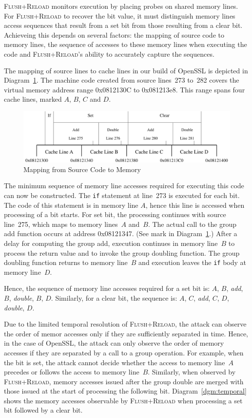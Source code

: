 \documentclass{llncs}
\begin{document}
\textsc{Flush+Reload} monitors execution by placing probes on shared memory lines.
For \textsc{Flush+Reload} to recover the bit value, it must distinguish memory lines access sequences
that result from a set bit from those resulting from a clear bit.
Achieveing this depends on several factors: the mapping of source code to memory lines, 
the sequence of accesses to these memory lines when executing the code and 
\textsc{Flush+Reload}'s ability to accurately capture the sequences.


The mapping of source lines to cache lines in our build of OpenSSL is depicted in Diagram~\ref{dgm:memory}.
The machine code created from source lines~273 to~282 covers the virtual memory address range 0x0812130C
to 0x081213e8.
This range spans four cache lines, marked $A$, $B$, $C$ and $D$.


\begin{figure}[htb]
\centering\includegraphics[width=\columnwidth]{images/memory}
\caption{Mapping from Source Code to Memory\label{dgm:memory}}
\end{figure}


The minimum sequence of memory line accesses required for executing this code can now be constructed.
The \texttt{if} statement at line~273 is executed for each bit.  
The code of this statement is in memory line $A$, hence this line is accessed when processing of a bit starts.
For set bit, the processing continues with source line~275, which maps to memory lines~$A$ and~$B$.
The actual call to the group add function occurs at address 0x08121347.
(See mark in Diagram~\ref{dgm:memory}.)
After a delay for computing the group add, execution continues in memory line~$B$ to process the return value and 
to invoke the group doubling function.
The group doubling function returns to memory line~$B$ and execution leaves the \texttt{if} body at memory line~$D$.

Hence, the sequence of memory line accesses required for a set bit is: $A$, $B$, \textit{add}, $B$, \textit{double}, $B$, $D$.
Similarly, for a clear bit, the sequence is: $A$, $C$, \textit{add}, $C$, $D$, \textit{double}, $D$.

Due to the limited temporal resolution of \textsc{Flush+Reload}, the attack can observe the order of memor accesses only
if they are sufficiently separated in time.
Hence, in the case of OpenSSL, the attack can only observe the order of memory accesses if they are separated by a call
to a group operation.
For example, when the bit is set, the attack cannot decide whether the access to memory line~$A$ precedes or follows the access
to memory line~$B$.
Similarly, when observed by \textsc{Flush+Reload}, memory accesses issued after the group double are merged with those 
issued at the start of processing the following bit.
Diagram~\ref{dgm:temporal} shows the memory accesses observable by \textsc{Flush+Reload} when processing a set bit followed by
a clear bit.
\end{document}
